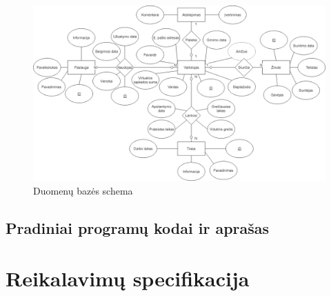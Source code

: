 \documentclass[oneside]{VUMIFPSkursinis}
\begin{document}
			\begin{figure}[h]
    				\centering
    				\includegraphics[width=1\textwidth]{Database2.png}
    				\caption{Duomenų bazės schema}
			\end{figure}
			
			\pagebreak
	\subsection{Pradiniai programų kodai ir aprašas}

\section{Reikalavimų specifikacija}
\end{document}

